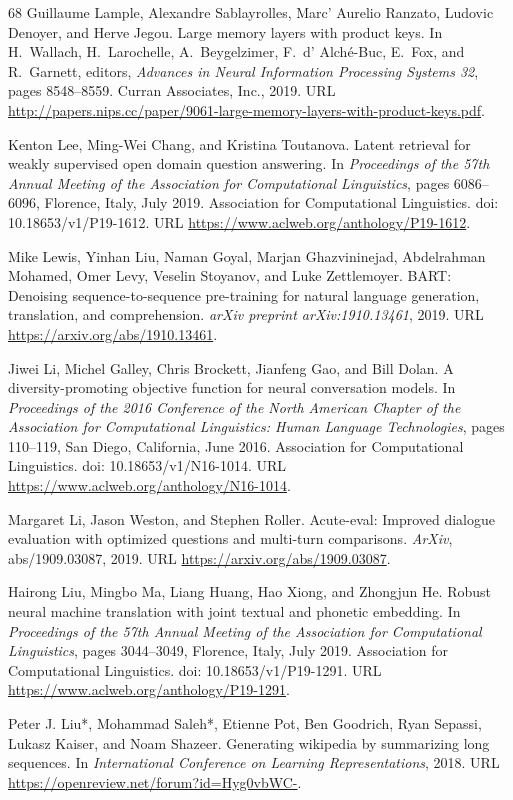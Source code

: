 \documentclass[10pt,letterpaper]{article}
\begin{document}
{\begin{thebibliography}{68}
 Guillaume Lample, Alexandre Sablayrolles, Marc' Aurelio Ranzato,
Ludovic Denoyer, and Herve Jegou. Large memory layers with product keys. In
H.~Wallach, H.~Larochelle, A.~Beygelzimer, F.~d' Alché-Buc, E.~Fox, and
R.~Garnett, editors, \emph{Advances in Neural Information Processing Systems
32}, pages 8548--8559. Curran Associates, Inc., 2019. URL
\url{http://papers.nips.cc/paper/9061-large-memory-layers-with-product-keys.pdf}.

 Kenton Lee, Ming-Wei Chang, and Kristina Toutanova. Latent
retrieval for weakly supervised open domain question answering. In
\emph{Proceedings of the 57th Annual Meeting of the Association for
Computational Linguistics}, pages 6086--6096, Florence, Italy, July 2019.
Association for Computational Linguistics. doi: 10.18653/v1/P19-1612. URL
\url{https://www.aclweb.org/anthology/P19-1612}.

 Mike Lewis, Yinhan Liu, Naman Goyal, Marjan Ghazvininejad,
Abdelrahman Mohamed, Omer Levy, Veselin Stoyanov, and Luke Zettlemoyer. BART:
Denoising sequence-to-sequence pre-training for natural language generation,
translation, and comprehension. \emph{arXiv preprint arXiv:1910.13461}, 2019.
URL \url{https://arxiv.org/abs/1910.13461}.

 Jiwei Li, Michel Galley, Chris Brockett, Jianfeng Gao, and Bill
Dolan. A diversity-promoting objective function for neural conversation models.
In \emph{Proceedings of the 2016 Conference of the North American Chapter of the
Association for Computational Linguistics: Human Language Technologies}, pages
110--119, San Diego, California, June 2016. Association for Computational
Linguistics. doi: 10.18653/v1/N16-1014. URL
\url{https://www.aclweb.org/anthology/N16-1014}.

 Margaret Li, Jason Weston, and Stephen Roller. Acute-eval:
Improved dialogue evaluation with optimized questions and multi-turn
comparisons. \emph{ArXiv}, abs/1909.03087, 2019. URL
\url{https://arxiv.org/abs/1909.03087}.

 Hairong Liu, Mingbo Ma, Liang Huang, Hao Xiong, and Zhongjun He.
Robust neural machine translation with joint textual and phonetic embedding. In
\emph{Proceedings of the 57th Annual Meeting of the Association for
Computational Linguistics}, pages 3044--3049, Florence, Italy, July 2019.
Association for Computational Linguistics. doi: 10.18653/v1/P19-1291. URL
\url{https://www.aclweb.org/anthology/P19-1291}.

 Peter J. Liu*, Mohammad Saleh*, Etienne Pot, Ben Goodrich, Ryan
Sepassi, Lukasz Kaiser, and Noam Shazeer. Generating wikipedia by summarizing
long sequences. In \emph{International Conference on Learning Representations},
2018. URL \url{https://openreview.net/forum?id=Hyg0vbWC-}.


\end{thebibliography}}
\end{document}
